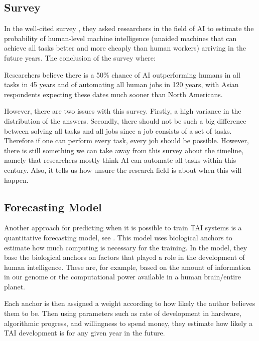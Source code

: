 \documentclass[12pt,A4]{report}
\theoremstyle{definition}
\begin{document}
\subsection{Survey}
In the well-cited survey \citet{Grace}, they asked researchers in the field of AI to estimate the probability of human-level machine intelligence (unaided machines that can achieve all tasks better and more cheaply than human workers) arriving in the future years. The conclusion of the survey where:
\begin{displayquote}
Researchers believe there is a 50\% chance of AI outperforming humans in all tasks in 45 years and of automating all human jobs in 120 years, with Asian respondents expecting these dates much sooner than North Americans.
\end{displayquote}
However, there are two issues with this survey. Firstly, a high variance in the distribution of the answers. Secondly, there should not be such a big difference between solving all tasks and all jobs since a job consists of a set of tasks. Therefore if one can perform every task, every job should be possible. However, there is still something we can take away from this survey about the timeline, namely that researchers mostly think AI can automate all tasks within this century. Also, it tells us how unsure the research field is about when this will happen. 

\subsection{Forecasting Model}
Another approach for predicting when it is possible to train TAI systems is a quantitative forecasting model, see \citet{Ajeya}. This model uses biological anchors to estimate how much computing is necessary for the training. In the model, they base the biological anchors on factors that played a role in the development of human intelligence. These are, for example, based on the amount of information in our genome or the computational power available in a human brain/entire planet. 

Each anchor is then assigned a weight according to how likely the author believes them to be. Then using parameters such as rate of development in hardware, algorithmic progress, and willingness to spend money, they estimate how likely a TAI development is for any given year in the future. 
\end{document}
